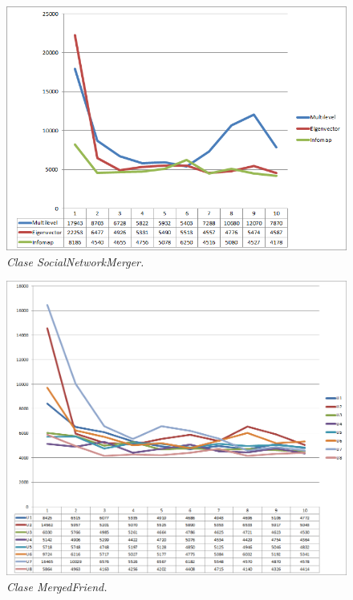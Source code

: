 \begin{figure}[H]
	\centering
	\includegraphics[scale=.4]{images/Figura5-10}
	\caption{\em Clase SocialNetworkMerger.}
	\label{fig:des-im10}
\end{figure}

\begin{figure}[H]
	\centering
	\includegraphics[scale=.4]{images/Figura5-11}
	\caption{\em Clase MergedFriend.}
	\label{fig:des-im11}
\end{figure}

